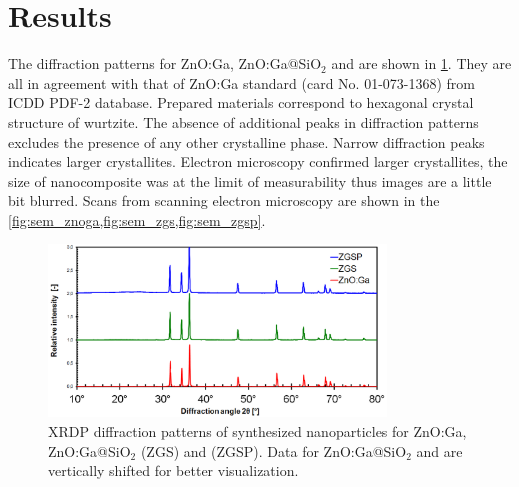 \section{Results}
\label{s:results}

    The diffraction patterns for ZnO:Ga, ZnO:Ga@SiO$_{2}$ and {\znoo} are shown in \cref{fig:xrdp_znO}. They are all in agreement with that of ZnO:Ga standard (card No. 01-073-1368) from ICDD PDF-2 database. Prepared materials correspond to  hexagonal crystal structure of wurtzite. The absence of additional peaks in diffraction patterns excludes the presence of any other crystalline phase. Narrow diffraction peaks indicates larger crystallites. Electron microscopy confirmed larger crystallites, the size of nanocomposite was at the limit of measurability thus images are a little bit blurred. Scans from scanning electron microscopy are shown in the \cref{fig:sem_znoga,fig:sem_zgs,fig:sem_zgsp}.\\
    
    \begin{figure}
        \centering
        \includegraphics[width=0.8\textwidth]{pictures/xrd_januar_18.PNG}
        \caption{XRDP diffraction patterns of synthesized nanoparticles for ZnO:Ga, ZnO:Ga@SiO$_{2}$ (ZGS) and {\znoo} (ZGSP). Data for ZnO:Ga@SiO$_{2}$ and {\znoo} are vertically shifted for better visualization.}
        \label{fig:xrdp_znO}
    \end{figure}
    
